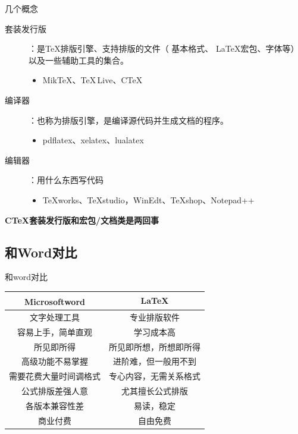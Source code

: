 \documentclass[UTF8,11pt]{beamer}
\begin{document}
\begin{frame}{几个概念}
	\begin{description}
		\item[套装发行版] ：是\TeX 排版引擎、支持排版的文件（ 基本格式、 \LaTeX 宏包、字体等）以及一些辅助工具的集合。
			\begin{itemize}
				\item Mik\TeX、{\color{red}\TeX \,Live}、CTeX
			\end{itemize}
		\item[编译器]：也称为排版引擎，是编译源代码并生成文档的程序。
		\begin{itemize}
			\item pdflatex、xelatex、lualatex
		\end{itemize}
		\item[编辑器] ：用什么东西写代码
		\begin{itemize}
			\item TeXworks、TeXstudio，WinEdt、TeXshop、Notepad++
		\end{itemize}	
	\end{description}

	\bfseries CTeX套装发行版和\CTeX 宏包/文档类是两回事
\end{frame}

\subsection{和Word对比}
\begin{frame}{和word对比}
	\begin{center}
		\begin{tabular}{c|c}
			\hline
			Microsoft\textsuperscript{\textregistered}word & \LaTeX \\
			\hline
			\rowcolor{black!20}
			文字处理工具			& 专业排版软件  \\
			容易上手，简单直观 	  & 学习成本高   \\
			\rowcolor{gray!40}
			所见即所得			 & 所见即所想，所想即所得  \\
			高级功能不易掌握 	   & 进阶难，但一般用不到  \\
			\rowcolor{gray!40}
			需要花费大量时间调格式	& 专心内容，无需关系格式 \\
			公式排版差强人意	  & 尤其擅长公式排版 \\
			\rowcolor{gray!40}
			各版本兼容性差		  & 易读，稳定 \\
			商业付费			& 自由免费 \\
			\hline
		\end{tabular}	
	\end{center}
\end{frame}
\end{document}
